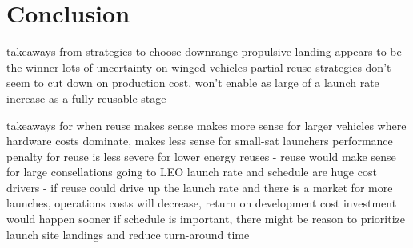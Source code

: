 \documentclass[conf]{new-aiaa}
\begin{document}
\section{Conclusion}

takeaways from strategies to choose
downrange propulsive landing appears to be the winner
lots of uncertainty on winged vehicles
partial reuse strategies don't seem to cut down on production cost, won't enable as large of a launch rate increase as a fully reusable stage

takeaways for when reuse makes sense
makes more sense for larger vehicles where hardware costs dominate, makes less sense for small-sat launchers
performance penalty for reuse is less severe for lower energy reuses - reuse would make sense for large consellations going to LEO
launch rate and schedule are huge cost drivers - if reuse could drive up the launch rate and there is a market for more launches, operations costs will decrease, return on development cost investment would happen sooner
if schedule is important, there might be reason to prioritize launch site landings and reduce turn-around time


\end{document}
